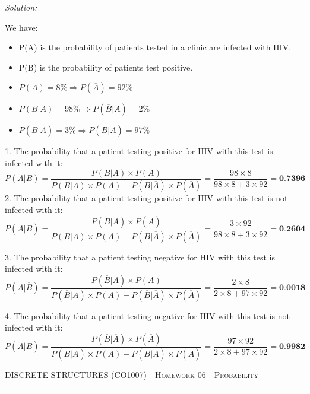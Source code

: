 \documentclass[12pt]{amsart}
\begin{document}
\bigskip
\textit{Solution:}
\medskip

We have:
\begin{itemize}
\item P(A) is the probability of patients tested in a clinic are infected with HIV.
\item P(B) is the probability of patients test positive.

\item {$P(A) = 8\% \Rightarrow P(\overline{A}) = 92\%$}

\item {$P(B|A) = 98\% \Rightarrow P(\overline{B}|A) = 2\%$}

\item {$P(B|\overline{A}) = 3\% \Rightarrow P(\overline{B}|\overline{A}) =97\%$}
\end{itemize}

1. The probability that a patient testing positive for HIV with this test is infected with it:  
$$ P(A|B) = \frac{P(B|A) \times P(A)}{P(B|A) \times P(A) + P(B|\overline{A}) \times P(\overline{A})} = \frac{98 \times 8}{98 \times 8 + 3 \times 92} = \textbf{0.7396} $$
2. The probability that a patient testing positive for HIV with this test is not infected with it:
$$ P(\overline{A}|B) = \frac{P(B|\overline{A}) \times P(\overline{A})}{P(B|A) \times P(A) + P(B|\overline{A}) \times P(\overline{A})} = \frac{3 \times 92}{98 \times 8 + 3 \times 92} = \textbf{0.2604} $$

3. The probability that a patient testing negative for HIV with this test is infected with it: 
$$ P(A|\overline{B}) = \frac{P(\overline{B}|A) \times P(A)}{P(\overline{B}|A) \times P(A) + P(\overline{B}|\overline{A}) \times P(\overline{A})} = \frac{2 \times 8}{2 \times 8 + 97 \times 92} = \textbf{0.0018} $$

4. The probability that a patient testing negative for HIV with this test is not infected with it:
$$ P(\overline{A}|\overline{B}) = \frac{P(\overline{B}|\overline{A}) \times P(\overline{A})}{P(\overline{B}|A) \times P(A) + P(\overline{B}|\overline{A}) \times P(\overline{A})} = \frac{97 \times 92}{2 \times 8 + 97 \times 92} = \textbf{0.9982} $$
\newpage

{\scshape } \hfill {\scshape DISCRETE STRUCTURES (CO1007) - Homework 06 - Probability} \hfill {\scshape }
 
\smallskip

\hrule

\bigskip

\bigskip 
\end{document}
